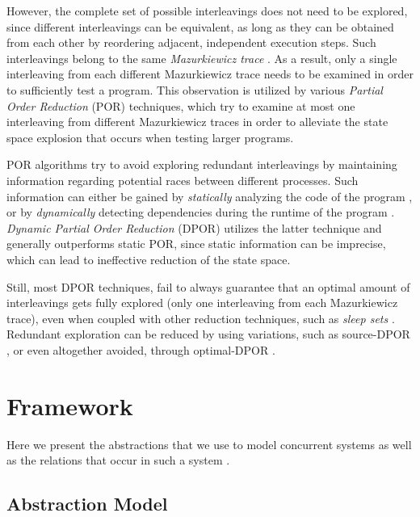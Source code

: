 However, the complete set of possible interleavings does not need to be explored, since different
interleavings can be equivalent, as long as they can be obtained from each other by reordering adjacent, independent execution steps. 
Such interleavings belong to the same \textit{Mazurkiewicz trace} \cite{10.1007/3-540-17906-2_30}.
As a result, only a single interleaving from each different Mazurkiewicz trace needs to be examined in order
to sufficiently test a program. This observation is utilized by various \textit{Partial Order Reduction} (POR) \cite{Godefroid1996, POR, 
10.1007/3-540-53863-1_36}
techniques, which try to examine at most one interleaving from different Mazurkiewicz traces in order to alleviate 
the state space explosion that occurs when testing larger programs.

POR algorithms try to avoid exploring redundant interleavings by maintaining information regarding potential races between different processes. 
Such information can either be gained by \textit{statically} analyzing the code of the program \cite{Static1997},
or by \textit{dynamically} detecting dependencies during the runtime of the program \cite{FlanaganDPOR}. \textit{Dynamic 
Partial Order Reduction} (DPOR) utilizes the latter technique and generally outperforms static POR,
since static information can be imprecise, which can lead to ineffective reduction of the state space.

Still, most DPOR techniques, fail to always guarantee that an optimal amount of interleavings gets fully explored (only one 
interleaving from each Mazurkiewicz trace), 
even when coupled with other reduction techniques, such as \textit{sleep sets} \cite{Godefroid1996}. Redundant exploration
can be reduced by using variations, such as source-DPOR \cite{AbdullaAronisJohnssonSagonasDPOR2014}, or even altogether avoided, through optimal-DPOR 
\cite{AbdullaAronisJohnssonSagonasDPOR2014}.

\section{Framework}

Here we present the abstractions that we use to model concurrent systems as well as the relations that
occur in such a system \cite{AbdullaAronisJohnssonSagonasDPOR2014}.

\subsection{Abstraction Model}

